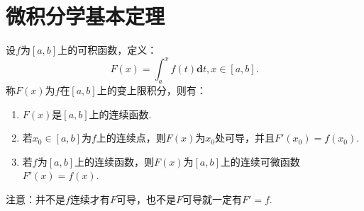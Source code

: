\section{微积分学基本定理}

\begin{theorem}[微积分学基本定理]
	设$f$为$[a,b]$上的可积函数，定义：
	\begin{equation}
		F(x)=\int_{a}^{x}f(t)\textbf{d}t,x\in [a,b].
	\end{equation}
	称$F(x)$为$f$在$[a,b]$上的变上限积分，则有：
	\begin{enumerate}
		\item $F(x)$是$[a,b]$上的连续函数.
		\item 若$x_0\in[a,b]$为$f$上的连续点，则$F(x)$为$x_0$处可导，并且$F'(x_0)=f(x_0)$.
		\item 若$f$为$[a,b]$上的连续函数，则$F(x)$为$[a,b]$上的连续可微函数$F'(x)=f(x)$.
	\end{enumerate}
	注意：并不是$f$连续才有$F$可导，也不是$F$可导就一定有$F'=f$.
\end{theorem}